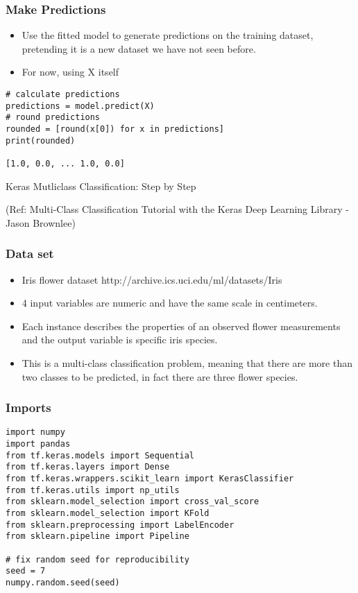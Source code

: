 \begin{frame}[fragile] \frametitle{Make Predictions}
 \begin{itemize}
\item Use the fitted model to generate predictions on the training dataset, pretending it is a new dataset we have not seen before.
\item For now, using X itself
\end{itemize}
\begin{lstlisting}
# calculate predictions
predictions = model.predict(X)
# round predictions
rounded = [round(x[0]) for x in predictions]
print(rounded)

[1.0, 0.0, ... 1.0, 0.0]
\end{lstlisting}
\end{frame}


\begin{frame}
  \begin{center}
    {\Large Keras Mutliclass Classification: Step by Step}
    
    \tiny{(Ref:  Multi-Class Classification Tutorial with the Keras Deep Learning Library - Jason Brownlee)}
  \end{center}
\end{frame}


\begin{frame}[fragile] \frametitle{Data set}
 \begin{itemize}
 \item  Iris flower dataset http://archive.ics.uci.edu/ml/datasets/Iris
 \item  4 input variables are numeric and have the same scale in centimeters. 
 \item Each instance describes the properties of an observed flower measurements and the output variable is specific iris species.
 \item This is a multi-class classification problem, meaning that there are more than two classes to be predicted, in fact there are three flower species.
\end{itemize}
\end{frame}

\begin{frame}[fragile] \frametitle{Imports}
\begin{lstlisting}
import numpy
import pandas
from tf.keras.models import Sequential
from tf.keras.layers import Dense
from tf.keras.wrappers.scikit_learn import KerasClassifier
from tf.keras.utils import np_utils
from sklearn.model_selection import cross_val_score
from sklearn.model_selection import KFold
from sklearn.preprocessing import LabelEncoder
from sklearn.pipeline import Pipeline

# fix random seed for reproducibility
seed = 7
numpy.random.seed(seed)
\end{lstlisting}
\end{frame}

